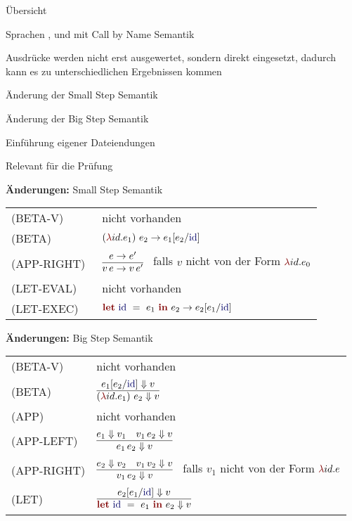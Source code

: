{
  \begin{itemgroup}{Übersicht}
    \item Sprachen \LZEROCBN, \LONECBN und \LTWOCBN  mit Call by Name Semantik
    \item Ausdrücke werden nicht erst ausgewertet, sondern direkt eingesetzt,
          dadurch kann es zu unterschiedlichen Ergebnissen kommen
    \item Änderung der Small Step Semantik
    \item Änderung der Big Step Semantik
    \item Einführung eigener Dateiendungen
    \item Relevant für die Prüfung \glqq \TPONE \grqq
  \end{itemgroup}
}


{
  {\bf Änderungen:} Small Step Semantik\\[5mm]
  \begin{tabular}{ll}
     \mbox{(BETA-V)}      & nicht vorhanden \\[3mm]
     \mbox{(BETA)}        & $\ExprApplication{\Parenthesis{\ExprLambda{id}{}{e_1}}}{e_2} \to
                                               e_1[e_2/\ExprIdentifier{id}]$ \\[3mm]
     \mbox{(APP-RIGHT)\ } & $\smallsteprule{e \to e'}
                              {v\,e \to v\,e'}$ \ 
                              falls ${v}$ nicht von der Form $\ExprLambda{id}{}{e_0}$ \\[5mm]
     \mbox{(LET-EVAL)\  } & nicht vorhanden \\[3mm]
     \mbox{(LET-EXEC)}    & $\ExprLet{\ExprIdentifier{id}}{}{e_1}{e_2} \to
                                      e_2[e_1/\ExprIdentifier{id}]$ \\[3mm]
  \end{tabular}
}


{
  {\bf Änderungen:} Big Step Semantik\\[5mm]
  \begin{tabular}{ll}
     \mbox{(BETA-V)}      & nicht vorhanden \\[3mm]
     \mbox{(BETA)}        & $\bigsteprule{e_1[e_2/\ExprIdentifier{id}] \eval v}
                              {\ExprApplication{\Parenthesis{\ExprLambda{id}{}{e_1}}}{e_2} \eval v}$ \\[5mm]
     \mbox{(APP)}         & nicht vorhanden \\[3mm]
     \mbox{(APP-LEFT)}    & $\bigsteprule{e_1 \eval v_1 \quad v_1\,e_2 \eval v}
                              {e_1\,e_2 \eval v}$ \\[5mm]
     \mbox{(APP-RIGHT)}   & $\bigsteprule{e_2 \eval v_2 \quad v_1\,v_2 \eval v}
                              {v_1\,e_2 \eval v}$ \ 
                              falls ${v_1}$ nicht von der Form $\ExprLambda{id}{}{e}$ \\[5mm]
     \mbox{(LET)}         & $\bigsteprule{e_2[e_1/\ExprIdentifier{id}] \eval v}
                              {\ExprLet{\ExprIdentifier{id}}{}{e_1}{e_2} \eval v}$ \\[5mm]
  \end{tabular}
}


